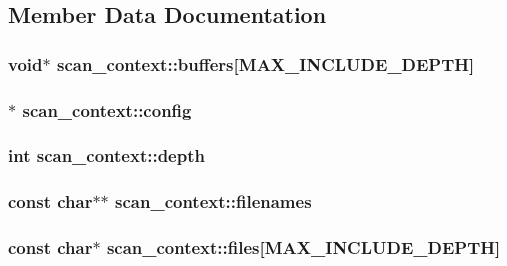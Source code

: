 \subsection{Member Data Documentation}
\hypertarget{structscan__context_a49a22b83cacfde03f8f3ac70784ef202}{
\subsubsection[{buffers}]{\setlength{\rightskip}{0pt plus 5cm}void$\ast$ scan\-\_\-context\-::buffers\mbox{[}{\bf M\-A\-X\-\_\-\-I\-N\-C\-L\-U\-D\-E\-\_\-\-D\-E\-P\-T\-H}\mbox{]}}}\label{structscan__context_a49a22b83cacfde03f8f3ac70784ef202}
\hypertarget{structscan__context_a535f3ae7e1140baf91f736e833192147}{
\subsubsection[{config}]{$\ast$ scan\-\_\-context\-::config}}\label{structscan__context_a535f3ae7e1140baf91f736e833192147}
\hypertarget{structscan__context_aad7af2747860597a923bdd8cca07bd83}{
\subsubsection[{depth}]{\setlength{\rightskip}{0pt plus 5cm}int scan\-\_\-context\-::depth}}\label{structscan__context_aad7af2747860597a923bdd8cca07bd83}
\hypertarget{structscan__context_a772a7e1bd1d4c20a03393667835557c8}{
\subsubsection[{filenames}]{\setlength{\rightskip}{0pt plus 5cm}const char$\ast$$\ast$ scan\-\_\-context\-::filenames}}\label{structscan__context_a772a7e1bd1d4c20a03393667835557c8}
\hypertarget{structscan__context_a2b37e18ccf435f4a0d302dd3e01c9b12}{
\subsubsection[{files}]{\setlength{\rightskip}{0pt plus 5cm}const char$\ast$ scan\-\_\-context\-::files\mbox{[}{\bf M\-A\-X\-\_\-\-I\-N\-C\-L\-U\-D\-E\-\_\-\-D\-E\-P\-T\-H}\mbox{]}}}\label{structscan__context_a2b37e18ccf435f4a0d302dd3e01c9b12}
